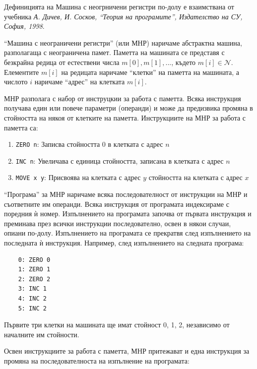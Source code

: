 \documentclass[12pt,a4paper]{article}
\begin{document}
\small{Дефиницията на Машина с неогрничени регистри по-долу е взаимствана от учебника \cite{tprog}\textit{А. Дичев, И. Сосков, ``Теория на програмите'', Издателство на СУ, София, 1998}.

\vspace{20px}

\begin{mdframed}[hidealllines=true,backgroundcolor=gray!20]

	``Машина с неограничени регистри'' (или МНР) наричаме абстрактна машина, разполагаща с неограничена памет. Паметта на машината се представя с безкрайна редица от естествени числа $m[0],m[1],...$, където $m[i] \in \mathcal{N}$. Елементите $m[i]$ на редицата наричаме ``клетки'' на паметта на машината, а числото $i$ наричаме ``адрес'' на клетката $m[i]$.

	 МНР разполага с набор от инструцкии за работа с паметта. Всяка инструкция получава един или повече параметри (операнди) и може да предизвика промяна в стойността на някоя от клетките на паметта. Инструкциите на МНР за работа с паметта са:

	\begin{enumerate}[label=\arabic*)]
		\item \texttt{ZERO n}: Записва стойността 0 в клетката с адрес $n$
		\item \texttt{INC n}: Увеличава с единица стойността, записана в клетката с адрес $n$
		\item \texttt{MOVE x y}: Присвоява на клетката с адрес $y$ стойността на клетката с адрес $x$
	\end{enumerate}

	``Програма'' за МНР наричаме всяка последователност от инструкции на МНР и съответните им операнди. Всяка инструкция от програмата индексираме с поредния ѝ номер. Изпълнението на програмата започва от първата инструкция и преминава през всички инструкции последователно, освен в някои случаи, опиани по-долу. Изпълнението на програмата се прекратвя след изпълнението на последната ѝ инструкция. Например, след изпълнението на следната програма:

	\begin{verbatim}
	0: ZERO 0
	1: ZERO 1
	2: ZERO 2
	3: INC 1
	4: INC 2
	5: INC 2
	\end{verbatim}

	Първите три клетки на машината ще имат стойност 0, 1, 2, независимо от началните им стойности.

	Освен инструкциите за работа с паметта, МНР притежават и една инструкция за промяна на последователноста на изпълнение на програмата:


\end{mdframed}}
\end{document}
